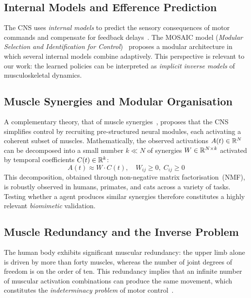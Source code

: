 \subsection{Internal Models and Efference Prediction}

The CNS uses \textit{internal models} to predict the sensory consequences of motor
commands and compensate for feedback delays~\parencite{Wolpert1998}. The MOSAIC
model (\textit{Modular Selection and Identification for Control})~\parencite{Wolpert1998}
proposes a modular architecture in which several internal models combine
adaptively. This perspective is relevant to our work: the learned \DRL{} policies can
be interpreted as \textit{implicit inverse models} of musculoskeletal dynamics.

\subsection{Muscle Synergies and Modular Organisation}
\label{sec:synergies_related}

A complementary theory, that of muscle synergies~\parencite{dAvella2003,
Ting2007, Bizzi2013}, proposes that the CNS simplifies control by recruiting
pre-structured neural modules, each activating a coherent subset of muscles.
Mathematically, the observed activations $A(t) \in \mathbb{R}^{N}$ can be decomposed into a
small number $k \ll N$ of synergies $W \in \mathbb{R}^{N \times k}$ activated by temporal
coefficients $C(t) \in \mathbb{R}^k$:
\begin{equation}
  A(t) \approx W \cdot C(t), \quad W_{ij} \geq 0, \; C_{ij} \geq 0
  \label{eq:nmf_principle}
\end{equation}
This decomposition, obtained through non-negative matrix factorisation~(NMF), is
robustly observed in humans, primates, and cats across a variety of tasks. Testing
whether a \DRL{} agent produces similar synergies therefore constitutes a highly
relevant \textit{biomimetic} validation.

\subsection{Muscle Redundancy and the Inverse Problem}

The human body exhibits significant muscular redundancy: the upper limb alone is
driven by more than forty muscles, whereas the number of joint degrees of freedom is
on the order of ten. This redundancy implies that an infinite number of muscular
activation combinations can produce the same movement, which constitutes the
\textit{indeterminacy problem} of motor control~\parencite{Zajac1989}.

